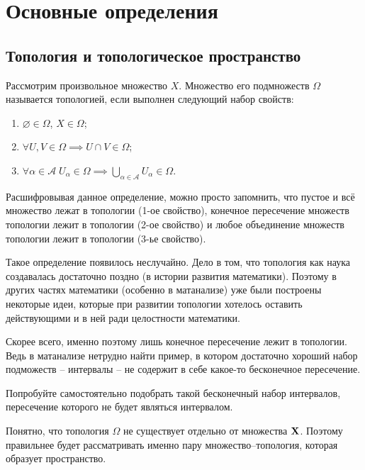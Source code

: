 \section{Основные определения}
\subsection{Топология и топологическое пространство}
\begin{Def}[Топология]
    Рассмотрим произвольное множество $X$. Множество его подмножеств $\Omega$ называется топологией, если выполнен следующий набор свойств:
    \begin{enumerate}
        \item $\varnothing \in \Omega$, $X \in \Omega$;
        \item $\forall U, V \in \Omega  \implies U \cap V \in \Omega$;
        \item $\forall \alpha \in \mathcal{A} \; U_\alpha \in \Omega \implies \bigcup\limits_{\alpha\in\mathcal{A}} U_\alpha \in \Omega $.
    \end{enumerate}
\end{Def}

Расшифровывая данное определение, можно просто запомнить, что пустое и всё множество лежат в топологии (1-ое свойство), конечное пересечение множеств топологии лежит в топологии (2-ое свойство) и любое объединение множеств топологии лежит в топологии (3-ье свойство).
\begin{Note}
    Такое определение появилось неслучайно. Дело в том, что топология как наука создавалась достаточно поздно (в истории развития математики). Поэтому в других частях математики (особенно в матанализе) уже были построены некоторые идеи, которые при развитии топологии хотелось оставить действующими и в ней ради целостности математики.

    Скорее всего, именно поэтому лишь конечное пересечение лежит в топологии. Ведь в матанализе нетрудно найти пример, в котором достаточно хороший набор подможеств -- интервалы -- не содержит в себе какое-то бесконечное пересечение. 
\end{Note}
\begin{Task}
    Попробуйте самостоятельно подобрать такой бесконечный набор интервалов, пересечение которого не будет являться интервалом.
\end{Task}

Понятно, что топология $\Omega$ не существует отдельно от множества $\mathbf{X}$. Поэтому правильнее будет рассматривать именно пару множество--топология, которая образует пространство. 

